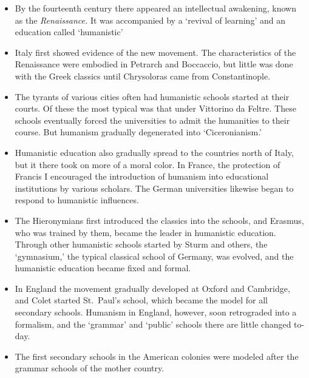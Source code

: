 \documentclass[]{book}
\providecommand{\tightlist}{%
  \setlength{\itemsep}{0pt}\setlength{\parskip}{0pt}}
\begin{document}
\begin{itemize}
\tightlist
\item
  By the fourteenth century there appeared an intellectual awakening, known as the \emph{Renaissance.} It was accompanied by a `revival of learning' and an education called `humanistic'
\item
  Italy first showed evidence of the new movement. The characteristics of the Renaissance were embodied in Petrarch and Boccaccio, but little was done with the Greek classics until Chrysoloras came from Constantinople.
\item
  The tyrants of various cities often had humanistic schools started at their courts. Of these the most typical was that under Vittorino da Feltre. These schools eventually forced the universities to admit the humanities to their course. But humanism gradually degenerated into `Ciceronianism.'
\item
  Humanistic education also gradually spread to the countries north of Italy, but it there took on more of a moral color. In France, the protection of Francis I encouraged the introduction of humanism into educational institutions by various scholars. The German universities likewise began to respond to humanistic influences.
\item
  The Hieronymians first introduced the classics into the schools, and Erasmus, who was trained by them, became the leader in humanistic education. Through other humanistic schools started by Sturm and others, the `gymnasium,' the typical classical school of Germany, was evolved, and the humanistic education became fixed and formal.
\item
  In England the movement gradually developed at Oxford and Cambridge, and Colet started St.~Paul's school, which became the model for all secondary schools. Humanism in England, however, soon retrograded into a formalism, and the `grammar' and `public' schools there are little changed to-day.
\item
  The first secondary schools in the American colonies were modeled after the grammar schools of the mother country.
\end{itemize}
\end{document}
